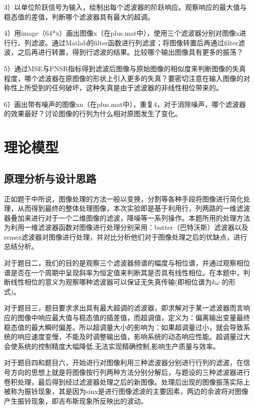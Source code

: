 \documentclass{article}
\begin{document}
3）以单位阶跃信号为输入，绘制出每个滤波器的阶跃响应。观察响应的最大值与稳态值的差值，判断哪个滤波器具有最大的超调。 


4）用image（64*x）画出图像x（在plus.mat中），使用三个滤波器分别对图像x进行行、列滤波。通过Matlab的filter函数进行列滤波；将图像转置后再通过filter滤波，之后再进行转置，得到行滤波的结果。比较哪个输出图像具有更多的振荡？


5）通过MSE与PNSR指标得到滤波后图像与原始图像的相似度来判断图像的失真程度，哪个滤波器在原图像的形状上引入更多的失真？要密切注意在输入图像的对称性上所受到的任何破坏，这种失真是由于滤波器的非线性相位带来的。 


6）画出带有噪声的图像xn（在plus.mat中），重复4，对于消除噪声，哪个滤波器的效果最好？讨论图像的行列为什么相对原图发生了变化。
\section{理论模型}
\subsection{原理分析与设计思路}
正如题干中所说，图像处理的方法一般以变换，分割等各种手段将图像进行简化处理，从而得到最终的整体处理图像，本次实验即是基于利用行，列两路的一维滤波器叠加来进行对于一个二维图像的滤波，降噪等一系列操作。本题所用的处理方法为利用一维滤波器函数对图像进行处理分别采用：butter（巴特沃斯）滤波器以及remez滤波器对图像进行处理，并对比分析他们对于图像处理之后的优缺点，进行总结分析。

对于题目二，我们的目的是观察三个滤波器频谱的幅度与相位谱，并通过观察相位谱是否在一个周期中呈现斜率为恒定值来判断其是否具有线性相位。在本题中，判断线性相位的意义为观察哪种滤波器可以保证无失真传输(即相位谱为$k\omega$ 的形式)。

对于题目三，题目要求求出具有最大超调的滤波器，即求解对于某一滤波器而言响应的图像中响应最大值与稳态值的插差值，而超调值，定义为：偏离输出变量最终稳态值的最大瞬时偏差。所以超调量大小的影响为：如果超调量过小，就会导致系统的响应速度变慢，不能及时调整输出值，影响系统的动态响应性能。超调量过大会使系统的控制精度大幅降低,无法实现精确控制,影响生产质量与效率。

对于题目四和题目六，开始进行对图像利用三种滤波器分别进行行列的滤波，在信号方向的思想上就是将图像按行列两种方法分别分解后，与题设的三种滤波器进行卷积处理，最后得到经过滤波器处理之后的新图像。处理后出现的图像振荡实际上被称为振铃现象，其是因为sinx是进行图像滤波的主要因素，两边的余波将对图像产生振铃现象，即吉布斯现象所反映出的波动。
\end{document}
